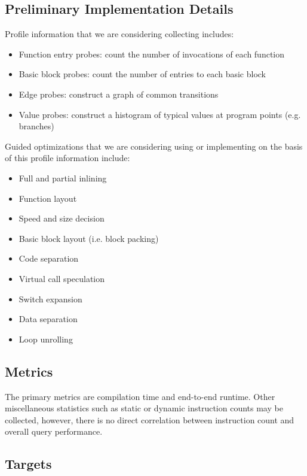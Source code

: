 \documentclass{vldb}
\begin{document}
\subsection{Preliminary Implementation Details}

Profile information that we are considering collecting includes:

\begin{itemize}
    \item Function entry probes: count the number of invocations of each function
    \item Basic block probes: count the number of entries to each basic block
    \item Edge probes: construct a graph of common transitions
    \item Value probes: construct a histogram of typical values at program points (e.g. branches)
\end{itemize}

Guided optimizations that we are considering using or implementing on the basis of this profile information include:

\begin{itemize}
    \item Full and partial inlining
    \item Function layout
    \item Speed and size decision
    \item Basic block layout (i.e. block packing)
    \item Code separation
    \item Virtual call speculation
    \item Switch expansion
    \item Data separation
    \item Loop unrolling
\end{itemize}

\subsection{Metrics}

The primary metrics are compilation time and end-to-end runtime. Other miscellaneous statistics such as static or dynamic instruction counts may be collected, however, there is no direct correlation between instruction count and overall query performance.

\subsection{Targets}
\end{document}
